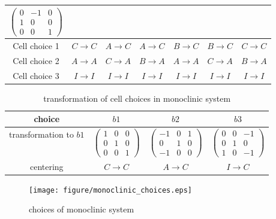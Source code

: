 \begin{table}[tb]
\begin{tabular}{c|cccccc}
      $\begin{pmatrix} 0&-1&0 \\ 1&0&0 \\ 0&0&1 \end{pmatrix}$ \\
    \hline
    Cell choice 1 & $C \to C$ & $A \to C$ & $A \to C$ & $B \to C$ & $B \to C$ & $C \to C$ \\
    Cell choice 2 & $A \to A$ & $C \to A$ & $B \to A$ & $A \to A$ & $C \to A$ & $B \to A$ \\
    Cell choice 3 & $I \to I$ & $I \to I$ & $I \to I$ & $I \to I$ & $I \to I$ & $I \to I$ \\
    \hline
  \end{tabular}
\end{table}

\begin{table}[tb]
  \centering
  \caption{transformation of cell choices in monoclinic system}
  \label{table-monoclinic-cellchoice}
  \begin{tabular}{c|ccc}
    \hline
    choice                 & $b1$                                                & $b2$                                                  & $b3$                                                  \\
    \hline
    transformation to $b1$ & $\begin{pmatrix} 1&0&0\\0&1&0\\0&0&1 \end{pmatrix}$ & $\begin{pmatrix} -1&0&1\\0&1&0\\-1&0&0 \end{pmatrix}$ & $\begin{pmatrix} 0&0&-1\\0&1&0\\1&0&-1 \end{pmatrix}$ \\
    \hline
    centering              & $C \to C$                                           & $A \to C$                                             & $I \to C$                                             \\
    \hline
  \end{tabular}
\end{table}

\begin{figure}[tb]
  \centering
  \texttt{[image: figure/monoclinic\_choices.eps]}
  \caption{choices of monoclinic system}
  \label{fig:monoclinic-choices}
\end{figure}

